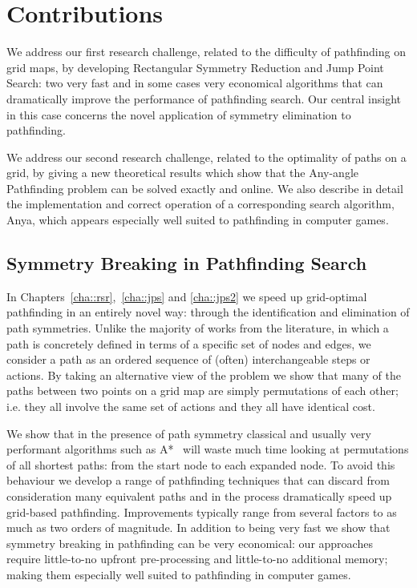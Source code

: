 \section{Contributions}
\label{cha::intro::contributions}
We address our first research challenge, related to the difficulty of
pathfinding on grid maps, by developing Rectangular Symmetry Reduction and
Jump Point Search: two very fast and in some cases very economical algorithms
that can dramatically improve the performance of pathfinding search.  Our
central insight in this case concerns the novel application of symmetry
elimination to pathfinding.

We address our second research challenge, related to the optimality of paths
on a grid, by giving a new theoretical results which show that the Any-angle
Pathfinding problem can be solved exactly and online. We also describe in
detail the implementation and correct operation of a corresponding search
algorithm, Anya, which appears especially well suited to pathfinding in
computer games.

\subsection{Symmetry Breaking in Pathfinding Search}
In Chapters~\ref{cha::rsr},~\ref{cha::jps} and \ref{cha::jps2} we speed up
grid-optimal pathfinding in an entirely novel way: through the identification
and elimination of path symmetries.  Unlike the majority of works from the
literature, in which a path is concretely defined in terms of a specific set
of nodes and edges, we consider a path as an ordered sequence of (often)
interchangeable steps or actions.  By taking an alternative view of the
problem we show that many of the paths between two points on a grid map are
simply permutations of each other; i.e.  they all involve the same set of
actions and they all have identical cost.

We show that in the presence of path symmetry classical and usually very
performant algorithms such as A{*}~\citep{hart68} will waste much time looking at
permutations of all shortest paths: from the start node to each expanded node.
To avoid this behaviour we develop a range of pathfinding techniques that can
discard from consideration many equivalent paths and in the process
dramatically speed up grid-based pathfinding.  Improvements typically range from 
several factors to as much as two orders of magnitude.  In addition
to being very fast we show that symmetry breaking in pathfinding can be very
economical: our approaches require little-to-no upfront pre-processing and
little-to-no additional memory; making them especially well suited to
pathfinding in computer games.

